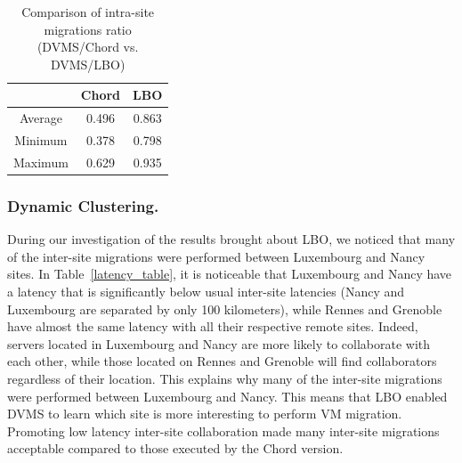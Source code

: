 \begin{table}
\vspace*{-.5cm}
  \begin{center}
    \begin{tabular}{|c|c|c|}   
      \hline \multicolumn{1}{|p{3cm}|}{ }
       & \multicolumn{1}{|p{3cm}|}{\centering Chord }  & \multicolumn{1}{|p{3cm}|}{ \centering LBO}  \\
      \hline
      Average & 0.496 & 0.863 \\
      \hline
      Minimum & 0.378 & 0.798 \\
      \hline
      Maximum & 0.629 & 0.935 \\
      \hline
    \end{tabular}
  \end{center}
  \caption{\label{migration_table} Comparison of intra-site migrations ratio (DVMS/Chord vs. DVMS/LBO)}
\vspace*{-1.3cm}
\end{table}

\subsubsection{Dynamic Clustering.}

During our investigation of the results brought about LBO, we noticed that many of the
inter-site migrations were performed between Luxembourg and Nancy sites.
In Table~\ref{latency_table}, it is noticeable that Luxembourg and Nancy have a latency that is significantly
below usual inter-site latencies (Nancy and Luxembourg are separated by only 100 kilometers),
while Rennes and Grenoble have almost the same latency with all their respective remote sites.
Indeed, servers located in Luxembourg and Nancy are more likely to collaborate with each other, while those located
on Rennes and Grenoble will find collaborators regardless of their location. This explains
why many of the inter-site migrations were performed between Luxembourg and Nancy.
This means that LBO enabled DVMS to learn which site is more interesting to perform VM
migration. Promoting low latency inter-site collaboration made many inter-site
migrations acceptable compared to those executed by the Chord version.

